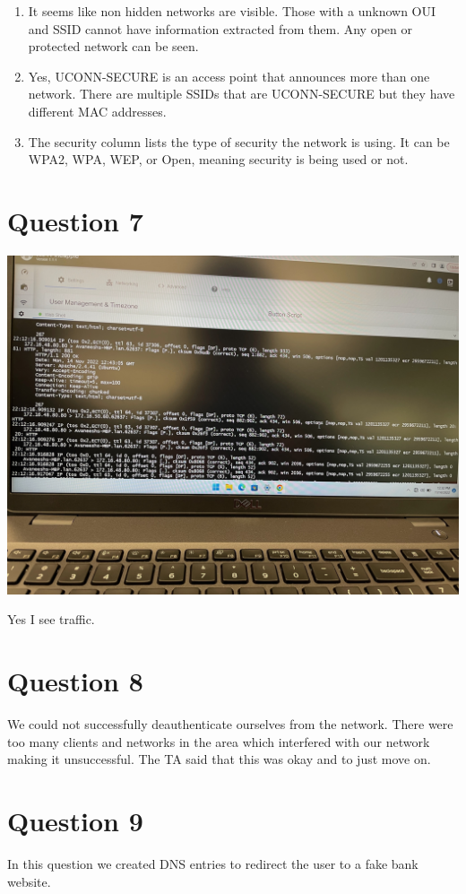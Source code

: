 \documentclass[12pt]{article}
\begin{document}
\begin{enumerate}
    \item It seems like non hidden networks are visible. Those with a unknown OUI and SSID cannot have information extracted from them.
    Any open or protected network can be seen.
    \item Yes, UCONN-SECURE is an access point that announces more than one network. There are multiple SSIDs that are UCONN-SECURE but they have different MAC addresses.
    \item The security column lists the type of security the network is using. It can be WPA2, WPA, WEP, or Open, meaning security is being used or not.
\end{enumerate}

\section*{Question 7}

\begin{center}
    \includegraphics[scale=.07]{images/q7.jpg}
\end{center}

Yes I see traffic.

\section*{Question 8}

We could not successfully deauthenticate ourselves from the network. There
were too many clients and networks in the area which interfered with our
network making it unsuccessful. The TA said that this was okay and to just
move on.

\section*{Question 9}

In this question we created DNS entries to redirect the user to a fake
bank website. 
\end{document}

